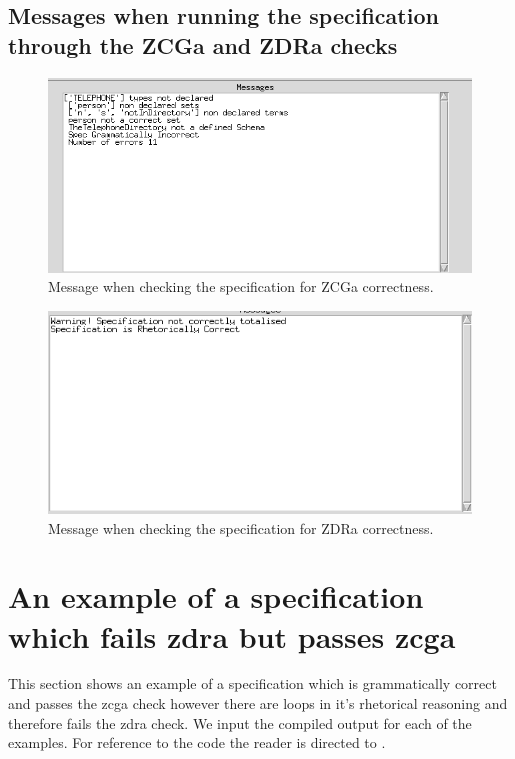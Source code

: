 \subsection{Messages when running the specification through the ZCGa and ZDRa checks}

\begin{figure}[H]
\includegraphics[scale=0.7]{examples/nonworkzcga/incorrect.png}
\caption{Message when checking the specification for ZCGa correctness.}
\end{figure}

\begin{figure}[H]
\includegraphics[scale=0.7]{examples/nonworkzcga/correct.png}
\caption{Message when checking the specification for ZDRa correctness.}
\end{figure}

\section{An example of a specification which fails \gls{zdra} but passes \gls{zcga}}
\label{app:failzdra}
This section shows an example of a specification which is grammatically correct and passes the \gls{zcga} check however there are loops in it's rhetorical reasoning and therefore fails the \gls{zdra} check. We input the compiled output for each of the examples. For reference to the code the reader is directed to \cite{mathlangexamples}.

